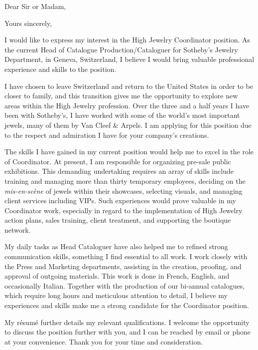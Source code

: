 \date{June 28, 2014}
\opening{Dear Sir or Madam,}
\closing{Yours sincerely,}
\makelettertitle


I would like to express my interest in the High Jewelry Coordinator position.  As the current Head of Catalogue Production/Cataloguer for Sotheby’s Jewelry Department, in Geneva, Switzerland, I believe I would bring valuable professional experience and skills to the position.


I have chosen to leave Switzerland and return to the United States in order to be closer to family, and this transition gives me the opportunity to explore new areas within the High Jewelry profession. Over the three and a half years I have been with Sotheby’s, I have worked with some of the world's most important jewels, many of them by Van Cleef \& Arpels. I am applying for this position due to the respect and admiration I have for your company's creations.


The skills I have gained in my current position would help me to excel in the role of Coordinator.  At present, I am responsible for organizing pre-sale public exhibitions. This demanding undertaking requires an array of skills include training and managing more than thirty temporary employees, deciding on the \textit{mis-en-sc\`{e}ne} of jewels within their showcases, selecting visuals, and managing client services including VIPs. Such experiences would prove valuable in my Coordinator work, especially in regard to the implementation of High Jewelry action plans, sales training, client treatment, and supporting the boutique network.


My daily tasks as Head Cataloguer have also helped me to refined strong communication skills, something I find essential to all work. I  work closely with the Press and Marketing departments, assisting in the creation, proofing, and approval of outgoing materials. This work is done in French, English, and occasionally Italian. Together with the production of our bi-annual catalogues, which require long hours and meticulous attention to detail, I believe my experiences and skills make me a strong candidate for the Coordinator position.


My r\'{e}sum\'{e} further details my relevant qualifications. I welcome the opportunity to discuss the position further with you, and I can be reached by email or phone at your convenience. Thank you for your time and consideration.


\makeletterclosing


